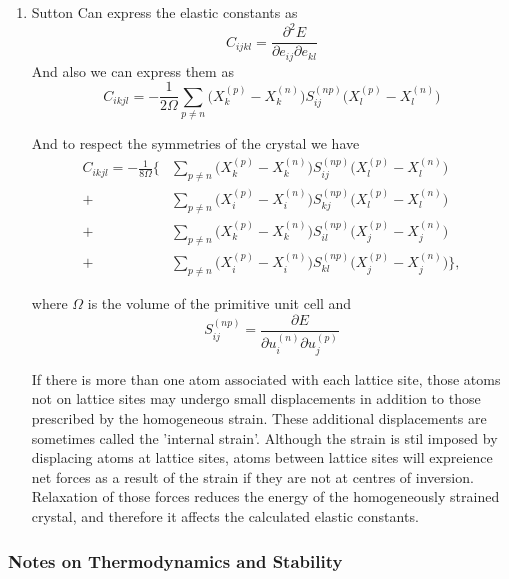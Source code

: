 \documentclass[11pt]{article}
\begin{document}
\begin{enumerate}
\item Sutton
\label{sec:org0151a5a}
Can express the elastic constants as 
\[ C_{ijkl} = \frac{\partial^2 E}{\partial e_{ij}\partial e_{kl}} \]
And also we can express them as 
\[ C_{ikjl} = -\frac{1}{2\Omega} \sum_{p\neq n} \big( X_k^{(p)} - X_k^{(n)} \big) S_{ij}^{(np)}  \big( X_l^{(p)} - X_l^{(n)}  \big)  \]

And to respect the symmetries of the crystal we have 
\begin{align}
 C_{ikjl} = -\frac{1}{8\Omega}  \Big\{ 
    &\sum_{p\neq n}\big( X_k^{(p)} - X_k^{(n)} \big) S_{ij}^{(np)}  \big( X_l^{(p)} - X_l^{(n)}  \big) \\
  + &\sum_{p\neq n}\big( X_i^{(p)} - X_i^{(n)} \big) S_{kj}^{(np)}  \big( X_l^{(p)} - X_l^{(n)}  \big) \\
  + &\sum_{p\neq n}\big( X_k^{(p)} - X_k^{(n)} \big) S_{il}^{(np)}  \big( X_j^{(p)} - X_j^{(n)}  \big) \\
  + &\sum_{p\neq n}\big( X_i^{(p)} - X_i^{(n)} \big) S_{kl}^{(np)}  \big( X_j^{(p)} - X_j^{(n)}  \big)  \Big\},
\end{align}

where \(\Omega\) is the volume of the primitive unit cell and
\[ S_{ij}^{(np)} =  \frac{\partial E}{\partial u_i^{(n)} \partial u_j^{(p)} } \]

If there is more than one atom associated with each lattice site, 
those atoms not on lattice sites may undergo small displacements in addition to those prescribed by the homogeneous strain.
These additional displacements are sometimes called the 'internal strain'. 
Although the strain is stil imposed by displacing atoms at lattice sites, atoms between lattice sites will expreience 
net forces as a result of the strain if they are not at centres of inversion. 
Relaxation of those forces reduces the energy of the homogeneously strained crystal, and therefore it affects the calculated elastic constants.
\end{enumerate}
\subsubsection{Notes on Thermodynamics and Stability}
\label{sec:org0f28478}
\end{document}
